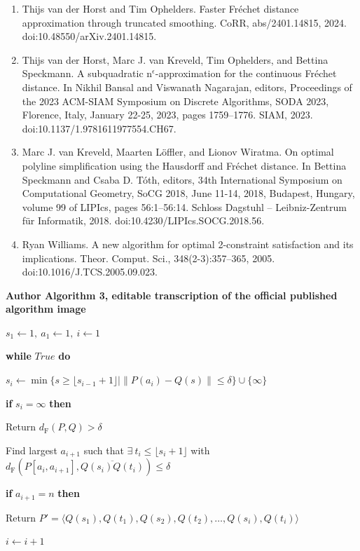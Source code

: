 \documentclass[10pt,a4paper]{article}
\begin{document}
\begin{enumerate}
\item[]  [26]  Thijs van der Horst and Tim Ophelders.  Faster Fréchet distance approximation through truncated smoothing.  CoRR, abs/2401.14815, 2024.  doi:10.48550/arXiv.2401.14815.  
\item[]  [27]  Thijs van der Horst, Marc J. van Kreveld, Tim Ophelders, and Bettina Speckmann.  A subquadratic n${}^{\mbox{{$\epsilon$}}}$-approximation for the continuous Fréchet distance.  In Nikhil Bansal and Viswanath Nagarajan, editors, Proceedings of the 2023 ACM-SIAM Symposium on Discrete Algorithms, SODA 2023, Florence, Italy, January 22-25, 2023, pages 1759–1776. SIAM, 2023.  doi:10.1137/1.9781611977554.CH67.  
\item[]  [28]  Marc J. van Kreveld, Maarten Löffler, and Lionov Wiratma.  On optimal polyline simplification using the Hausdorff and Fréchet distance.  In Bettina Speckmann and Csaba D. Tóth, editors, 34th International Symposium on Computational Geometry, SoCG 2018, June 11-14, 2018, Budapest, Hungary, volume 99 of LIPIcs, pages 56:1–56:14. Schloss Dagstuhl – Leibniz-Zentrum für Informatik, 2018.  doi:10.4230/LIPIcs.SOCG.2018.56.  
\item[]  [29]  Ryan Williams.  A new algorithm for optimal 2-constraint satisfaction and its implications.  Theor. Comput. Sci., 348(2-3):357–365, 2005.  doi:10.1016/J.TCS.2005.09.023.  
\end{enumerate}

\par\medskip\noindent\textbf{Author Algorithm 3, editable transcription of the official published algorithm image}\par
{}\quad $s_1\leftarrow 1,\ a_1\leftarrow 1,\ i\leftarrow 1$\par
{}\quad \textbf{while} $True$ \textbf{do}\par
{}\quad\quad $s_i\leftarrow\min\{s\geq\lfloor s_{i-1}+1\rfloor\mid\|P(a_i)-Q(s)\|\leq\delta\}\cup\{\infty\}$\par
{}\quad\quad \textbf{if} $s_i=\infty$ \textbf{then}\par
{}\quad\quad\quad Return $d_{\mathrm F}(P,Q)>\delta$\par
{}\quad\quad Find largest $a_{i+1}$ such that $\exists\ t_i\leq\lfloor s_i+1\rfloor$ with $d_{\mathrm F}(P[a_i,a_{i+1}],\overline{Q(s_i)Q(t_i)})\leq\delta$\par
{}\quad\quad \textbf{if} $a_{i+1}=n$ \textbf{then}\par
{}\quad\quad\quad Return $P'=\langle Q(s_1),Q(t_1),Q(s_2),Q(t_2),\ldots,Q(s_i),Q(t_i)\rangle$\par
{}\quad\quad $i\leftarrow i+1$\par
\end{document}
